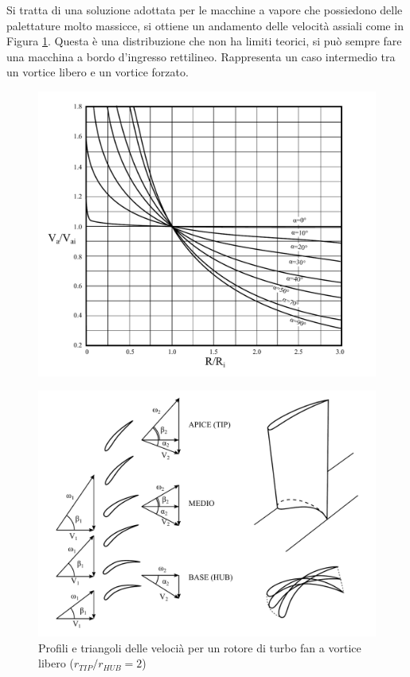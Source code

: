 Si tratta di una soluzione adottata per le macchine a vapore che possiedono delle palettature molto massicce, si ottiene un andamento delle velocità assiali come in Figura \ref{fig:AngPalCost}. Questa è una distribuzione che non ha limiti teorici, si può sempre fare una macchina a bordo d'ingresso rettilineo. Rappresenta un caso intermedio tra un vortice libero e un vortice forzato.
\begin{figure}
\centering
  \includegraphics[width=.8\textwidth]{fig/AngPalCost.pdf}
\caption{}
\label{fig:AngPalCost}
\end{figure}
\begin{figure}
\centering
  \includegraphics[width=.8\textwidth]{fig/TurboFan.pdf}
\caption{Profili e triangoli delle velocià per un rotore di turbo fan a vortice libero ($r_{TIP}/r_{HUB} =2$)}
\label{fig:TurboFan}
\end{figure}

